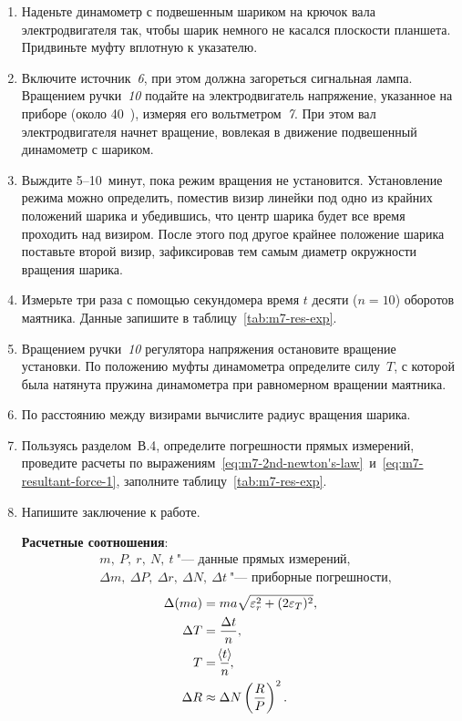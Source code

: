 \documentclass[a4paper, 12pt]{extarticle}
\newcommand{\eps}{\epsilon}
\begin{document}
\begin{enumerate}
\item Наденьте динамометр с подвешенным шариком на крючок вала электродвигателя так, чтобы шарик немного не касался плоскости планшета. Придвиньте муфту вплотную к указателю.
\item Включите источник~\emph{6}, при этом должна загореться сигнальная лампа.  Вращением ручки~\emph{10} подайте на электродвигатель напряжение, указанное на приборе (около 40~), измеряя его вольтметром~\emph{7}. При этом вал электродвигателя начнет вращение, вовлекая в движение подвешенный динамометр с шариком.
\item Выждите 5--10~минут, пока режим вращения не установится. Установление режима можно определить, поместив визир линейки под одно из крайних положений шарика и убедившись, что центр шарика будет все время проходить над визиром. После этого под другое крайнее положение шарика поставьте второй визир, зафиксировав тем самым диаметр окружности вращения шарика.
\item Измерьте три раза с помощью секундомера время $t$ десяти ($n = 10$) оборотов маятника. Данные запишите в таблицу~\ref{tab:m7-res-exp}.
\item Вращением ручки~\emph{10} регулятора напряжения остановите вращение установки. По положению муфты динамометра определите силу~$T$, с которой была натянута пружина динамометра при равномерном вращении маятника.
\item По расстоянию между визирами вычислите радиус вращения шарика.
\item Пользуясь разделом~В.4, определите погрешности прямых измерений, проведите расчеты по выражениям~\eqref{eq:m7-2nd-newton's-law}~и~\eqref{eq:m7-resultant-force-1}, заполните таблицу~\ref{tab:m7-res-exp}.
\item Напишите заключение к работе.

\textbf{Расчетные соотношения}: %
\begin{align*}
&m,\ P,\ r,\ N,\ t\ \text{"--- данные прямых измерений,} \\
&\Delta m,\ \Delta P,\ \Delta r,\ \Delta N,\ \Delta t\ \text{"--- приборные погрешности,} %
\end{align*} \begin{align*} 
\Delta (ma) &= ma\sqrt{\eps_r^2 + (2\eps_T)^2}, \\ %
\Delta T &= \dfrac{\Delta t}{n}, \\
T &= \dfrac{\MTDMean{t}}{n}, \\
\Delta R &\approx \Delta N \left(\dfrac{R}{P}\right)^2.
\end{align*}
\end{enumerate}
\end{document}
